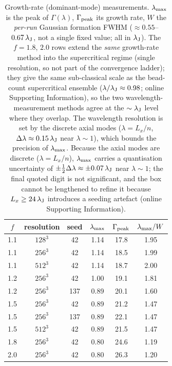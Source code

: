 \documentclass[usenatbib,twoside,twocolumn]{mnras}
\begin{document}
\begin{table}
\caption{Growth-rate (dominant-mode) measurements. $\lambda_{\rm max}$ is the peak of $\Gamma(\lambda)$, $\Gamma_{\rm peak}$ its growth rate, $W$ the \emph{per-run} Gaussian formation FWHM ($\approx0.55$--$0.67\,\lambda_{\rm J}$, not a single fixed value; all in $\lambda_{\rm J}$). The $f=1.8$, $2.0$ rows extend the \emph{same} growth-rate method into the supercritical regime (single resolution, so not part of the convergence ladder); they give the same sub-classical scale as the bead-count supercritical ensemble ($\lambda/\lambda_{\rm J}\approx0.98$; online Supporting Information), so the two wavelength-measurement methods agree at the $\sim\lambda_{\rm J}$ level where they overlap. The wavelength resolution is set by the discrete axial modes ($\lambda=L_x/n$, $\Delta\lambda\approx0.15\,\lambda_{\rm J}$ near $\lambda\sim1$), which bounds the precision of $\lambda_{\rm max}$. Because the axial modes are discrete ($\lambda=L_x/n$), $\lambda_{\rm max}$ carries a quantisation uncertainty of $\pm\tfrac12\Delta\lambda\approx\pm0.07\,\lambda_{\rm J}$ near $\lambda\sim1$; the final quoted digit is not significant, and the box cannot be lengthened to refine it because $L_x\geq24\,\lambda_{\rm J}$ introduces a seeding artefact (online Supporting Information).}
\label{tab:wave}
\footnotesize
\setlength{\tabcolsep}{4pt}
\begin{tabular}{cccccc}
\toprule
$f$ & resolution & seed & $\lambda_{\rm max}$ & $\Gamma_{\rm peak}$ & $\lambda_{\rm max}/W$ \\
\midrule
1.1 & $128^3$ & 42  & 1.14 & 17.8 & 1.95 \\
1.1 & $256^3$ & 42  & 1.14 & 18.5 & 1.99 \\
1.1 & $512^3$ & 42  & 1.14 & 18.7 & 2.00 \\
1.2 & $256^3$ & 42  & 1.00 & 19.1 & 1.81 \\
1.2 & $256^3$ & 137 & 0.89 & 20.1 & 1.60 \\
1.5 & $256^3$ & 42  & 0.89 & 21.2 & 1.47 \\
1.5 & $256^3$ & 137 & 0.89 & 22.1 & 1.47 \\
1.5 & $512^3$ & 42  & 0.89 & 21.5 & 1.47 \\
1.8 & $256^3$ & 42  & 0.80 & 24.6 & 1.19 \\
2.0 & $256^3$ & 42  & 0.80 & 26.3 & 1.20 \\
\bottomrule
\end{tabular}
\end{table}
\end{document}
